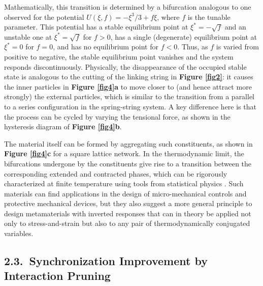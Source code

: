 \documentclass[
preprint,
superscriptaddress,
aps,
prl,
]{revtex4-1}
\begin{document}
Mathematically, this transition is determined by a bifurcation analogous to one observed for the potential $U(\xi, { f})=-\xi^3/3+{ f}\xi$, where ${ f}$ is the tunable parameter. This potential has a stable equilibrium point at $\xi^*=-\sqrt{ f}$ and an unstable one at $\xi^*=\sqrt{ f}$ for ${ f}>0$, has a single (degenerate) equilibrium point at $\xi^*=0$ for ${ f}=0$, and has no equilibrium point for ${ f}<0$. Thus, as ${ f}$ is varied from positive to negative, the stable equilibrium point vanishes and the system responds discontinuously. Physically, the disappearance of the occupied stable state is analogous to the cutting of the linking string in  \textbf{Figure \ref{fig2}}: it causes the inner particles in  \textbf{Figure \ref{fig4}a} to move closer
{\color{black} to}
 (and hence attract more strongly) 
 the external particles, which is similar to the transition from a parallel to a series configuration in the spring-string system. A key difference here is that the process can be cycled by varying the tensional force, as shown in the hysteresis diagram of \textbf{Figure \ref{fig4}b}.

The material itself can be formed by aggregating such constituents, as shown in \textbf{Figure \ref{fig4}c}  for a square lattice network. In the thermodynamic limit, the bifurcations undergone by the constituents give rise to a transition between the corresponding extended and contracted phases, which can be rigorously characterized at finite temperature using tools from statistical physics \cite{nicolaou2013longitudinal}. Such materials can find  applications in the design of micro-mechanical controls and protective mechanical devices, but they also suggest a more general principle to design metamaterials with inverted responses that can in theory be applied not only to stress-and-strain  but also to any pair of thermodynamically conjugated variables.


\subsection{2.3.~Synchronization Improvement  by Interaction Pruning}
\end{document}
